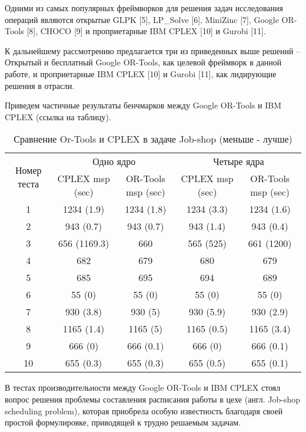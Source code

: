 Одними из самых популярных фреймворков для решения задач исследования операций являются открытые GLPK [5], LP\_Solve [6], MiniZinc [7], Google OR-Tools [8], CHOCO [9] и проприетарные IBM CPLEX [10] и Gurobi [11].

К дальнейшему рассмотрению предлагается три из приведенных выше решений -- Открытый и бесплатный Google OR-Tools, как целевой фреймворк в данной работе, и проприетарные IBM CPLEX [10] и Gurobi [11], как лидирующие решения в отрасли.

Приведем частичные результаты бенчмарков между Google OR-Tools и IBM CPLEX (ссылка на таблицу).

\begin{table}[H]
	\caption{Сравнение Or-Tools и CPLEX в задаче Job-shop (меньше - лучше)}\label{vs}
	\begin{adjustbox}{width=1\textwidth}
		\begin{tabular}{|c|c|c|c|c|}
			\hline \multirow{2}{*}{Номер теста} & \multicolumn{2}{|c|}{Одно ядро} & \multicolumn{2}{|c|}{Четыре ядра} \\
			\cline{2-5} & CPLEX msp (sec) & OR-Tools msp (sec) & CPLEX msp (sec) & OR-Tools msp (sec) \\
			\hline 1 & 1234 (1.9) & 1234 (1.8) & 1234 (3.3) & 1234 (1.6) \\
			\hline 2 & 943 (0.7) & 943 (0.7) & 943 (1.4) & 943 (0.4) \\
			\hline 3 & 656 (1169.3) & 660 & 565 (525) & 661 (1200) \\
			\hline 4 & 682 & 679 & 680 & 679 \\
			\hline 5 & 685 & 695 & 694 & 689 \\
			\hline 6 & 55 (0) & 55 (0) & 55 (0) & 55 (0) \\
			\hline 7 & 930 (3.8) & 930 (5) & 930 (5.9) & 930 (2.9) \\
			\hline 8 & 1165  (1.4) & 1165 (5) & 1165 (0.5) & 1165 (3.4) \\
			\hline 9 & 666 (0) & 666 (0.1) & 666 (0) & 666 (0.1) \\
			\hline 10 & 655 (0.3) & 655 (0.3) & 655 (0.5) & 655 (0.1) \\
			\hline 
		\end{tabular}
	\end{adjustbox}
\end{table}

В тестах производительности между Google OR-Tools и IBM CPLEX стоял вопрос решения проблемы составления расписания работы в цехе (англ. Job-shop scheduling problem), которая приобрела особую известность благодаря своей простой формулировке, приводящей к трудно решаемым задачам.

